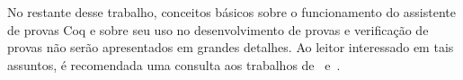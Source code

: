     No restante desse trabalho, conceitos básicos sobre o funcionamento do assistente de provas Coq e sobre seu uso no desenvolvimento de provas e verificação de provas não serão apresentados em grandes detalhes. Ao leitor interessado em tais assuntos, é recomendada uma consulta aos trabalhos de~ e~.